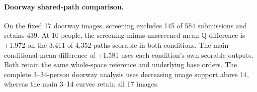 \paragraph{Doorway shared-path comparison.}
On the fixed 17 doorway images, screening excludes 145 of 584 submissions and retains 439. At 10 people, the screening-minus-unscreened mean Q difference is +1.972 on the 3,411 of 4,352 paths scorable in both conditions. The main conditional-mean difference of +1.581 uses each condition's own scorable outputs. Both retain the same whole-space reference and underlying base orders. The complete 3--34-person doorway analysis uses decreasing image support above 14, whereas the main 3--14 curves retain all 17 images.
